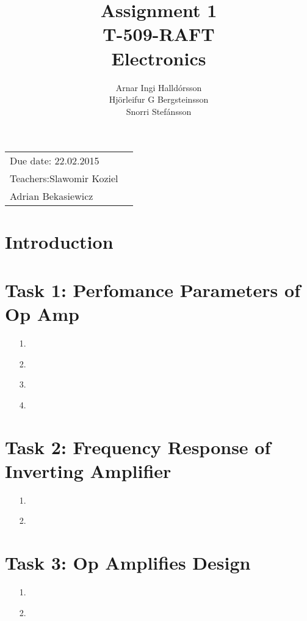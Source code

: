 \documentclass[11pt,a4paper]{article}
\title{Assignment 1 \\ T-509-RAFT \\ Electronics} %
\author{Arnar Ingi Halldórsson \\ Hjörleifur G Bergsteinsson \\ Snorri Stefánsson} %
\begin{document}
\maketitle %

\begin{tabular}{lr}
Due date: 22.02.2015 \\
Teachers:\qquad Slawomir Koziel\\ %
\qquad \qquad \qquad Adrian Bekasiewicz
\end{tabular}

\setlength\parindent{0pt} %

\renewcommand{\labelenumi}{\alph{enumi}.} %

\section*{Introduction}

\section*{Task 1: Perfomance Parameters of Op Amp}

\begin{enumerate}
  \item[1.]
  
  \item[2.]
  
  \item[3.]
  
  \item[4.]
  
\end{enumerate}

\section*{Task 2: Frequency Response of Inverting Amplifier}

\begin{enumerate}
  \item[1.]
  
  \item[2.]
  
\end{enumerate}

\section*{Task 3: Op Amplifies Design}

\begin{enumerate}
  \item[1.]
  
  \item[2.]
  
\end{enumerate}
\end{document}
